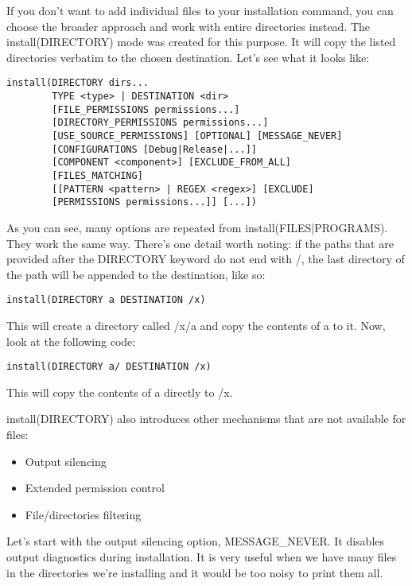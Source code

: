 If you don't want to add individual files to your installation command, you can choose the broader approach and work with entire directories instead. The install(DIRECTORY) mode was created for this purpose. It will copy the listed directories verbatim to the chosen destination. Let's see what it looks like:

\begin{lstlisting}[style=styleCMake]
install(DIRECTORY dirs...
		TYPE <type> | DESTINATION <dir>
		[FILE_PERMISSIONS permissions...]
		[DIRECTORY_PERMISSIONS permissions...]
		[USE_SOURCE_PERMISSIONS] [OPTIONAL] [MESSAGE_NEVER]
		[CONFIGURATIONS [Debug|Release|...]]
		[COMPONENT <component>] [EXCLUDE_FROM_ALL]
		[FILES_MATCHING]
		[[PATTERN <pattern> | REGEX <regex>] [EXCLUDE]
		[PERMISSIONS permissions...]] [...])
\end{lstlisting}

As you can see, many options are repeated from install(FILES|PROGRAMS). They work the same way. There's one detail worth noting: if the paths that are provided after the DIRECTORY keyword do not end with /, the last directory of the path will be appended to the destination, like so:

\begin{lstlisting}[style=styleCMake]
install(DIRECTORY a DESTINATION /x)
\end{lstlisting}

This will create a directory called /x/a and copy the contents of a to it. Now, look at the following code:

\begin{lstlisting}[style=styleCMake]
install(DIRECTORY a/ DESTINATION /x)
\end{lstlisting}

This will copy the contents of a directly to /x.

install(DIRECTORY) also introduces other mechanisms that are not available for files:

\begin{itemize}
\item 
Output silencing

\item 
Extended permission control

\item 
File/directories filtering
\end{itemize}

Let's start with the output silencing option, MESSAGE\_NEVER. It disables output diagnostics during installation. It is very useful when we have many files in the directories we're installing and it would be too noisy to print them all.

